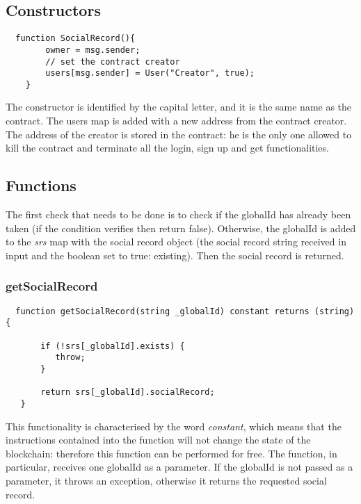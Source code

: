 \subsection{Constructors}
\begin{lstlisting}
  function SocialRecord(){
        owner = msg.sender;
        // set the contract creator
        users[msg.sender] = User("Creator", true);
    }
\end{lstlisting}
The constructor is identified by the capital letter, and it is the same name as the contract.
The users map is added with a new address from the contract creator.
The address of the creator is stored in the contract: he is the only one allowed to kill the contract and terminate all the login, sign up and get functionalities.

\subsection{Functions}
The first check that needs to be done is to check if the globalId has already been taken (if the condition verifies then return false).
Otherwise, the globalId is added to the \textit{srs} map with the social record object (the social record string received in input and the boolean set to true: existing). Then the social record is returned.

\subsubsection{getSocialRecord}

\begin{lstlisting}
  function getSocialRecord(string _globalId) constant returns (string) {

       if (!srs[_globalId].exists) {
          throw;
       }

       return srs[_globalId].socialRecord;
   }
\end{lstlisting}
This functionality is characterised by the word \textit{constant}, which means that the instructions contained into the function will not change the state of the blockchain: therefore this function can be performed for free.
The function, in particular, receives one globalId as a parameter. If the globalId is not passed as a parameter, it throws an exception, otherwise it returns the requested social record.

